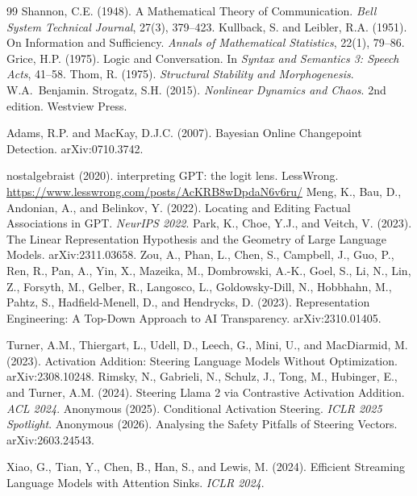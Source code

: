 \documentclass[11pt,a4paper]{article}
\begin{document}
\begin{thebibliography}{99}
 Shannon, C.E. (1948). A Mathematical Theory of Communication. \textit{Bell System Technical Journal}, 27(3), 379--423.
 Kullback, S. and Leibler, R.A. (1951). On Information and Sufficiency. \textit{Annals of Mathematical Statistics}, 22(1), 79--86.
 Grice, H.P. (1975). Logic and Conversation. In \textit{Syntax and Semantics 3: Speech Acts}, 41--58.
 Thom, R. (1975). \textit{Structural Stability and Morphogenesis}. W.A.\ Benjamin.
 Strogatz, S.H. (2015). \textit{Nonlinear Dynamics and Chaos}. 2nd edition. Westview Press.

 Adams, R.P. and MacKay, D.J.C. (2007). Bayesian Online Changepoint Detection. arXiv:0710.3742.

 nostalgebraist (2020). interpreting GPT: the logit lens. LessWrong. \url{https://www.lesswrong.com/posts/AcKRB8wDpdaN6v6ru/}
 Meng, K., Bau, D., Andonian, A., and Belinkov, Y. (2022). Locating and Editing Factual Associations in GPT. \textit{NeurIPS 2022}.
 Park, K., Choe, Y.J., and Veitch, V. (2023). The Linear Representation Hypothesis and the Geometry of Large Language Models. arXiv:2311.03658.
 Zou, A., Phan, L., Chen, S., Campbell, J., Guo, P., Ren, R., Pan, A., Yin, X., Mazeika, M., Dombrowski, A.-K., Goel, S., Li, N., Lin, Z., Forsyth, M., Gelber, R., Langosco, L., Goldowsky-Dill, N., Hobbhahn, M., Pahtz, S., Hadfield-Menell, D., and Hendrycks, D. (2023). Representation Engineering: A Top-Down Approach to AI Transparency. arXiv:2310.01405.

 Turner, A.M., Thiergart, L., Udell, D., Leech, G., Mini, U., and MacDiarmid, M. (2023). Activation Addition: Steering Language Models Without Optimization. arXiv:2308.10248.
 Rimsky, N., Gabrieli, N., Schulz, J., Tong, M., Hubinger, E., and Turner, A.M. (2024). Steering Llama 2 via Contrastive Activation Addition. \textit{ACL 2024}.
 Anonymous (2025). Conditional Activation Steering. \textit{ICLR 2025 Spotlight}.
 Anonymous (2026). Analysing the Safety Pitfalls of Steering Vectors. arXiv:2603.24543.

 Xiao, G., Tian, Y., Chen, B., Han, S., and Lewis, M. (2024). Efficient Streaming Language Models with Attention Sinks. \textit{ICLR 2024}.


\end{thebibliography}
\end{document}

